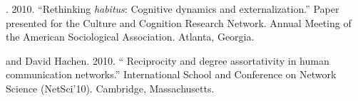 . 2010.  ``Rethinking \emph{habitus}: Cognitive dynamics and externalization.''  Paper presented for the Culture and Cognition Research Network.  Annual Meeting of the American Sociological Association. Atlanta, Georgia. 

 and David Hachen.  2010. `` Reciprocity and degree assortativity in human communication networks.'' International School and Conference on Network Science (NetSci'10). Cambridge, Massachusetts.



